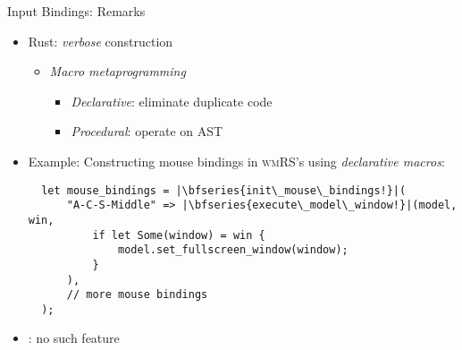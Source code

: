 \begin{frame}[t,fragile]{Input Bindings: Remarks}

    \begin{itemize}
        \itemsep.3em

        \item Rust: \textit{verbose}  construction
            \begin{itemize}
                \item \textit{Macro metaprogramming}
                    \begin{itemize}
                        \item \textit{Declarative}: eliminate duplicate code
                        \item \textit{Procedural}: operate on AST
                    \end{itemize}
            \end{itemize}

        \item Example: Constructing mouse bindings in \textsc{wmRS}'s using \textit{declarative macros}:\\[3pt]
\begin{verbatim}
  let mouse_bindings = |\bfseries{init\_mouse\_bindings!}|(
      "A-C-S-Middle" => |\bfseries{execute\_model\_window!}|(model, win,
          if let Some(window) = win {
              model.set_fullscreen_window(window);
          }
      ),
      // more mouse bindings
  );
\end{verbatim}

        \item \cpp: no such feature

    \end{itemize}

    \vfill

\end{frame}
